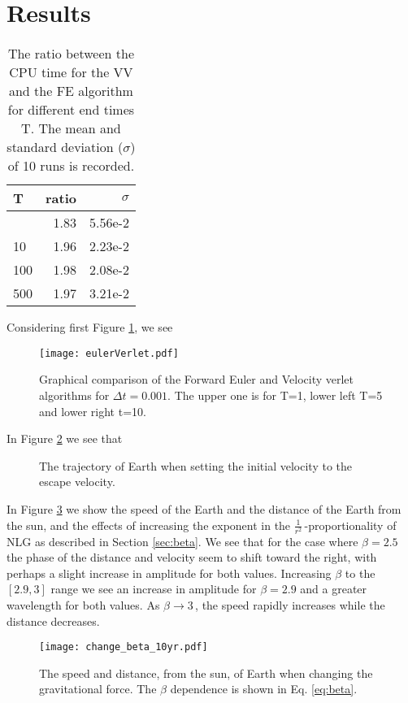 \section{Results}
\label{sec:results}

\begin{table}[htbp]
	\centering
	\begin{tabular}{lrr}
		T   & ratio & $\sigma$     \\
		\hline
		\addlinespace[0.1cm]
		1   & 1.83      & 5.56e-2 \\
		10  & 1.96      & 2.23e-2 \\
		100 & 1.98      & 2.08e-2 \\
		500 & 1.97      & 3.21e-2
	\end{tabular} \caption{The ratio between the CPU time for the VV and the FE algorithm for different end times T. The mean and standard deviation ($\sigma$) of 10 runs is recorded.}\label{table:time}
\end{table}

Considering first Figure \ref{fig:compare euler verlet}, we see
\begin{figure}[htbp]
	\centering
	\texttt{[image: eulerVerlet.pdf]}
	\caption{Graphical comparison of the Forward Euler and Velocity verlet algorithms for $\Delta t = 0.001$. The upper one is for T=1, lower left T=5 and lower right t=10.}
	\label{fig:compare euler verlet}
\end{figure}


In Figure \ref{fig:earth escape} we see that
\begin{figure}[htbp]
	\centering
	\caption{The trajectory of Earth when setting the initial velocity to the escape velocity.}
	\label{fig:earth escape}
\end{figure}

In Figure \ref{fig:changing beta} we show the speed of the Earth and the distance of the Earth from the sun, and the effects of increasing the exponent in the $\frac{1}{r^2}\,$-proportionality of NLG as described in Section \ref{sec:beta}. We see that for the case where $\beta=2.5$ the phase of the distance and velocity seem to shift toward the right, with perhaps a slight increase in amplitude for both values. Increasing $\beta$ to the $[2.9, 3]$ range we see an increase in amplitude for $\beta = 2.9$ and a greater wavelength for both values. As $\beta \rightarrow 3\,$, the speed rapidly increases while the distance decreases.
\begin{figure}[htbp]
	\centering
	\texttt{[image: change\_beta\_10yr.pdf]}
	\caption{The speed and distance, from the sun, of Earth when changing the gravitational force. The $\beta$ dependence is shown in Eq. \ref{eq:beta}.}
	\label{fig:changing beta}
\end{figure}

